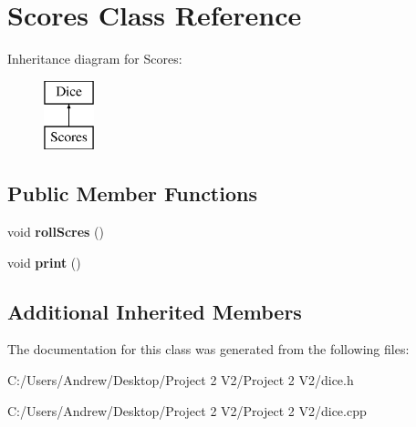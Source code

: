 \hypertarget{class_scores}{}\section{Scores Class Reference}
\label{class_scores}
Inheritance diagram for Scores\+:\begin{figure}[H]
\begin{center}
\leavevmode
\includegraphics[height=2.000000cm]{class_scores}
\end{center}
\end{figure}
\subsection*{Public Member Functions}
\begin{DoxyCompactItemize}
\item 
\mbox{\label{class_scores_a0c8e4646e9f50403e07dc8348266edee}} 
void {\bfseries roll\+Scres} ()
\item 
\mbox{\label{class_scores_ac46f2819ee979baecd75180b47753bbe}} 
void {\bfseries print} ()
\end{DoxyCompactItemize}
\subsection*{Additional Inherited Members}


The documentation for this class was generated from the following files\+:\begin{DoxyCompactItemize}
\item 
C\+:/\+Users/\+Andrew/\+Desktop/\+Project 2 V2/\+Project 2 V2/dice.\+h\item 
C\+:/\+Users/\+Andrew/\+Desktop/\+Project 2 V2/\+Project 2 V2/dice.\+cpp\end{DoxyCompactItemize}
